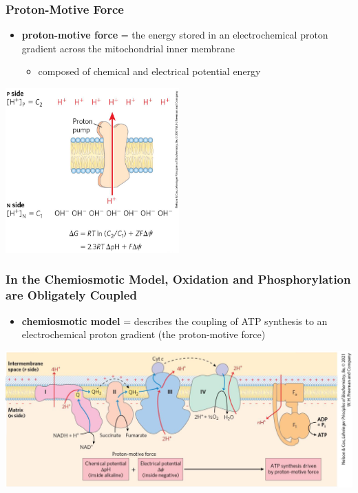 \documentclass[10pt]{article}
\begin{document}
\subsubsection*{Proton-Motive Force}
\begin{itemize}
	\item \textbf{proton-motive force} = the energy stored in an electrochemical proton gradient across the mitochondrial inner membrane
	\begin{itemize}
        \item composed of chemical and electrical potential energy
    \end{itemize}
\end{itemize}
\begin{center} 
	\includegraphics*[width=0.5\textwidth]{L2_22.png} 
\end{center}

\subsubsection*{In the Chemiosmotic Model, Oxidation and Phosphorylation are Obligately Coupled}
\begin{itemize}
	\item \textbf{chemiosmotic model} = describes the coupling of ATP synthesis to an electrochemical proton gradient (the proton-motive force)
\end{itemize}
\begin{center} 
	\includegraphics*[width=\textwidth]{L2_23.png} 
\end{center}
\end{document}
